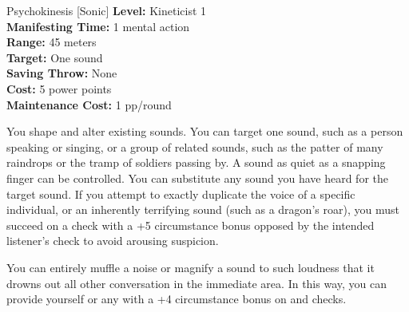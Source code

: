 {Psychokinesis [Sonic]}
{
	\textbf{Level:}
	Kineticist 1\\
	\textbf{Manifesting Time:}
	1 mental action\\
	\textbf{Range:}
	45 meters\\
	\textbf{Target:}
	One sound\\
	\textbf{Saving Throw:}
	None\\
	\textbf{Cost:}
	5 power points\\
	\textbf{Maintenance Cost:}
	1 pp/round\\
}
{
	You shape and alter existing sounds. You can target one sound, such as a person speaking or singing, or a group of related sounds, such as the patter of many raindrops or the tramp of soldiers passing by. A sound as quiet as a snapping finger can be controlled. You can substitute any sound you have heard for the target sound. If you attempt to exactly duplicate the voice of a specific individual, or an inherently terrifying sound (such as a dragon's roar), you must succeed on a  check with a +5 circumstance bonus opposed by the intended listener's  check to avoid arousing suspicion.

	You can entirely muffle a noise or magnify a sound to such loudness that it drowns out all other conversation in the immediate area. In this way, you can provide yourself or any with a +4 circumstance bonus on  and  checks.
}